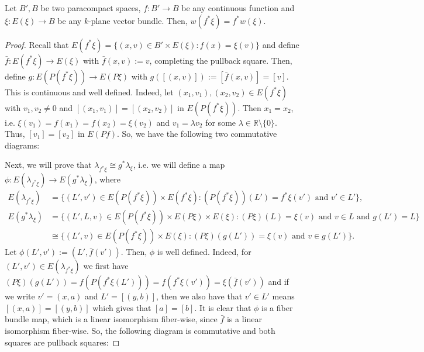 \begin{proposition} Let $B',B$ be two paracompact spaces, $f:B'\to B$ be any continuous function and $\xi:E(\xi)\to B$ be any $k$-plane vector bundle. Then, $w(f^*\xi)=f^*w(\xi)$.
\end{proposition}
\begin{proof} Recall that $E(f^*\xi)=\big\{(x,v)\in B'\times E(\xi):f(x)=\xi(v)\big\}$ and define $\bar{f}:E(f^*\xi)\to E(\xi)$ with $\bar{f}(x,v):=v$, completing the pullback square. Then, define $g:E(P(f^*\xi))\to E(P\xi)$ with $g([(x,v)]):=[\bar{f}(x,v)]=[v]$. This is continuous and well defined. Indeed, let $(x_1,v_1),(x_2,v_2)\in E(f^*\xi)$ with $v_1,v_2\neq 0$ and $[(x_1,v_1)]=[(x_2,v_2)]$ in $E(P(f^*\xi))$. Then $x_1=x_2$, i.e. $\xi(v_1)=f(x_1)=f(x_2)=\xi(v_2)$ and $v_1=\lambda v_2$ for some $\lambda\in\mathbb{R}\setminus\{0\}$. Thus, $[v_1]=[v_2]$ in $E(Pf)$. So, we have the following two commutative diagrams:
\begin{center}
\end{center}
Next, we will prove that $\lambda_{f^*\xi}\cong g^*\lambda_{\xi}$, i.e. we will define a map $\phi:E(\lambda_{f^*\xi})\to E(g^*\lambda_{\xi})$, where
\begin{align*}
E(\lambda_{f^*\xi})&=\big\{(L',v')\in E(P(f^*\xi))\times E(f^*\xi):(P(f^*\xi))(L')=f^*\xi(v')\text{ and }v'\in L'\big\},\\
E(g^*\lambda_{\xi})&=\big\{(L',L,v)\in E(P(f^*\xi))\times E(P\xi)\times E(\xi):(P\xi)(L)=\xi(v)\text{ and }v\in L\text{ and }g(L')=L\big\}\\
&\cong\big\{(L',v)\in E(P(f^*\xi))\times E(\xi):(P\xi)(g(L'))=\xi(v)\text{ and }v\in g(L')\big\}.
\end{align*}
Let $\phi(L',v'):=(L',\bar{f}(v'))$. Then, $\phi$ is well defined. Indeed, for $(L',v')\in E(\lambda_{f^*\xi})$ we first have $(P\xi)(g(L'))=f(P(f^*\xi(L')))=f(f^*\xi(v'))=\xi(\bar{f}(v'))$ and if we write $v'=(x,a)$ and $L'=[(y,b)]$, then we also have that $v'\in L'$ means $[(x,a)]=[(y,b)]$ which gives that $[a]=[b]$. It is clear that $\phi$ is a fiber bundle map, which is a linear isomorphism fiber-wise, since $\bar{f}$ is a linear isomorphism fiber-wise. So, the following diagram is commutative and both squares are pullback squares:

\end{proof}
